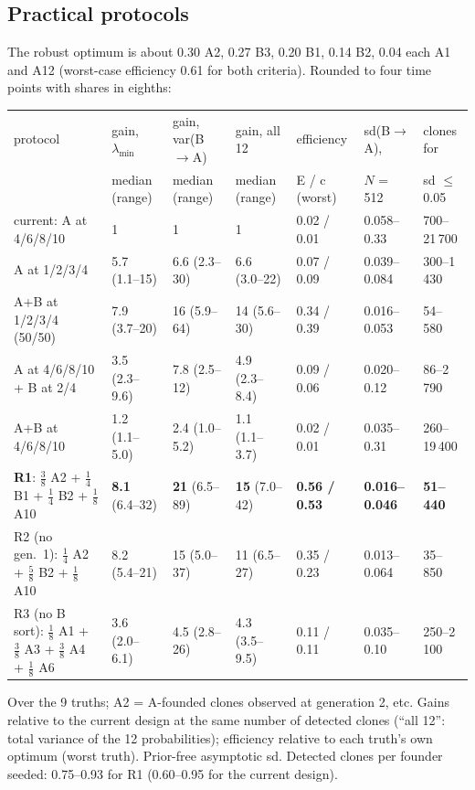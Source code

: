 \documentclass[10pt,a4paper]{article}
\newcommand{\BA}{B$\to$A}
\begin{document}
\subsection{Practical protocols}
The robust optimum is about 0.30 A2, 0.27 B3, 0.20 B1, 0.14 B2, 0.04 each A1 and A12 (worst-case efficiency 0.61 for both criteria). Rounded to four time points with shares in eighths:
\begin{center}\scriptsize\setlength{\tabcolsep}{1.5pt}
\begin{tabular}{@{}lllllll@{}}\toprule
protocol & gain, $\lambda_{\min}$ & gain, var(\BA) & gain, all 12 & efficiency & sd(\BA), & clones for \\
 & median (range) & median (range) & median (range) & E / c (worst) & $N$ = 512 & sd $\le$ 0.05 \\\midrule
current: A at 4/6/8/10 & 1 & 1 & 1 & 0.02 / 0.01 & 0.058--0.33 & 700--21\,700 \\
A at 1/2/3/4 & 5.7 (1.1--15) & 6.6 (2.3--30) & 6.6 (3.0--22) & 0.07 / 0.09 & 0.039--0.084 & 300--1\,430 \\
A+B at 1/2/3/4 (50/50) & 7.9 (3.7--20) & 16 (5.9--64) & 14 (5.6--30) & 0.34 / 0.39 & 0.016--0.053 & 54--580 \\
A at 4/6/8/10 + B at 2/4 & 3.5 (2.3--9.6) & 7.8 (2.5--12) & 4.9 (2.3--8.4) & 0.09 / 0.06 & 0.020--0.12 & 86--2\,790 \\
A+B at 4/6/8/10 & 1.2 (1.1--5.0) & 2.4 (1.0--5.2) & 1.1 (1.1--3.7) & 0.02 / 0.01 & 0.035--0.31 & 260--19\,400 \\
\textbf{R1}: $\tfrac38$ A2 + $\tfrac14$ B1 + $\tfrac14$ B2 + $\tfrac18$ A10 & \textbf{8.1} (6.4--32) & \textbf{21} (6.5--89) & \textbf{15} (7.0--42) & \textbf{0.56 / 0.53} & \textbf{0.016--0.046} & \textbf{51--440} \\
R2 (no gen.\ 1): $\tfrac14$ A2 + $\tfrac58$ B2 + $\tfrac18$ A10 & 8.2 (5.4--21) & 15 (5.0--37) & 11 (6.5--27) & 0.35 / 0.23 & 0.013--0.064 & 35--850 \\
R3 (no B sort): $\tfrac18$ A1 + $\tfrac38$ A3 + $\tfrac38$ A4 + $\tfrac18$ A6 & 3.6 (2.0--6.1) & 4.5 (2.8--26) & 4.3 (3.5--9.5) & 0.11 / 0.11 & 0.035--0.10 & 250--2\,100 \\\bottomrule
\end{tabular}

Over the 9 truths; A2 = A-founded clones observed at generation 2, etc. Gains relative to the current design at the same number of detected clones (``all 12'': total variance of the 12 probabilities); efficiency relative to each truth's own optimum (worst truth). Prior-free asymptotic sd. Detected clones per founder seeded: 0.75--0.93 for R1 (0.60--0.95 for the current design).
\end{center}
\end{document}
